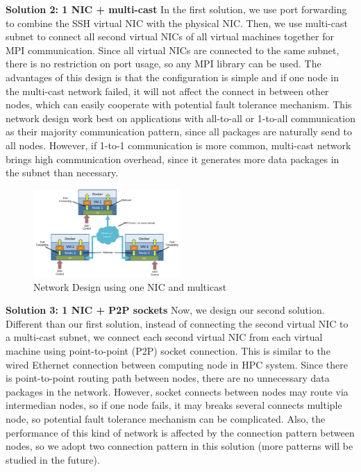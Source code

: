 \textbf{Solution 2: 1 NIC + multi-cast}
In the first solution, we use port forwarding to combine the SSH virtual NIC with the physical NIC. Then, we use multi-cast subnet to connect all second virtual NICs of all virtual machines together for MPI communication. Since all virtual NICs are connected to the same subnet, there is no restriction on port usage, so any MPI library can be used. The advantages of this design is that the configuration is simple and if one node in the multi-cast network failed, it will not affect the connect in between other nodes, which can easily cooperate with potential fault tolerance mechanism. This network design work best on applications with all-to-all or 1-to-all communication as their majority communication pattern, since all packages are naturally send to all nodes. However, if 1-to-1 communication is more common, multi-cast network brings high communication overhead, since it generates more data packages in the subnet than necessary. 
\begin{figure}[h]
    \centering
    \caption{Network Design using one NIC and multicast}
    \label{mcast}
    \includegraphics[width=0.5\textwidth]{figures/mcast.pdf}
\end{figure}
 
\textbf{Solution 3: 1 NIC + P2P sockets}
Now, we design our second solution. Different than our first solution, instead of connecting the second virtual NIC to a multi-cast subnet, we connect each second virtual NIC from each virtual machine using point-to-point (P2P) socket connection. This is similar to the wired Ethernet connection between computing node in HPC system. Since there is point-to-point routing path between nodes, there are no unnecessary data packages in the network. However, socket connects between nodes may route via intermedian nodes, so if one node fails, it may breaks several connects multiple node, so potential fault tolerance mechanism can be complicated. Also, the performance of this kind of network is affected by the connection pattern between nodes, so we adopt two connection pattern in this solution (more patterns will be studied in the future).

